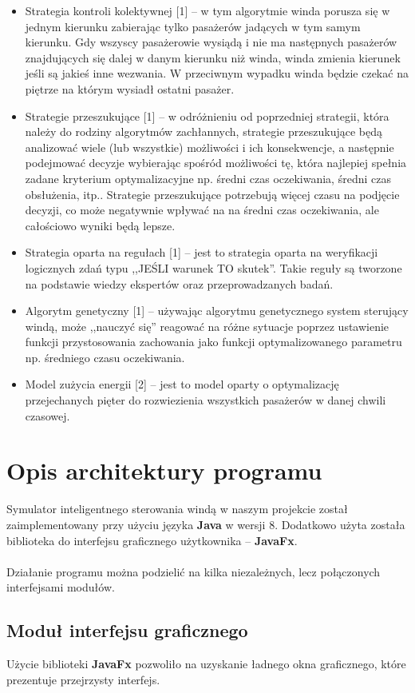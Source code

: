 \documentclass[a4paper,11pt]{article}
\begin{document}
\begin{itemize}
\item Strategia kontroli kolektywnej [1] -- w tym algorytmie winda porusza się w jednym kierunku zabierając tylko pasażerów jadących w tym samym kierunku. Gdy wszyscy pasażerowie wysiądą i nie ma następnych pasażerów znajdujących się dalej w danym kierunku niż winda, winda zmienia kierunek jeśli są jakieś inne wezwania. W przeciwnym wypadku winda będzie czekać na piętrze na którym wysiadł ostatni pasażer.
\item Strategie przeszukujące [1] -- w odróżnieniu od poprzedniej strategii, która należy do rodziny algorytmów zachłannych, strategie przeszukujące będą analizować wiele (lub wszystkie) możliwości i ich konsekwencje, a następnie podejmować decyzje wybierając spośród możliwości tę, która najlepiej spełnia zadane kryterium optymalizacyjne np. średni czas oczekiwania, średni czas obsłużenia, itp.. Strategie przeszukujące potrzebują więcej czasu na podjęcie decyzji, co może negatywnie wpływać na na średni czas oczekiwania, ale całościowo wyniki będą lepsze.
\item Strategia oparta na regułach [1] -- jest to strategia oparta na weryfikacji logicznych zdań typu ,,JEŚLI warunek TO skutek''. Takie reguły są tworzone na podstawie wiedzy ekspertów oraz przeprowadzanych badań.
\item Algorytm genetyczny [1] -- używając algorytmu genetycznego system sterujący windą, może ,,nauczyć się'' reagować na różne sytuacje poprzez ustawienie funkcji przystosowania zachowania jako funkcji optymalizowanego parametru np. średniego czasu oczekiwania.
\item Model zużycia energii [2] -- jest to model oparty o optymalizację przejechanych pięter do rozwiezienia wszystkich pasażerów w danej chwili czasowej.
\end{itemize}

\section{Opis architektury programu}
Symulator inteligentnego sterowania windą w naszym projekcie został zaimplementowany przy użyciu języka \textbf{Java} w wersji 8. Dodatkowo użyta została biblioteka do interfejsu graficznego użytkownika -- \textbf{JavaFx}.\\~\\
Działanie programu można podzielić na kilka niezależnych, lecz połączonych interfejsami modułów.
\subsection{Moduł interfejsu graficznego}
Użycie biblioteki \textbf{JavaFx} pozwoliło na uzyskanie ładnego okna graficznego, które prezentuje przejrzysty interfejs.\\~\\
\end{document}

